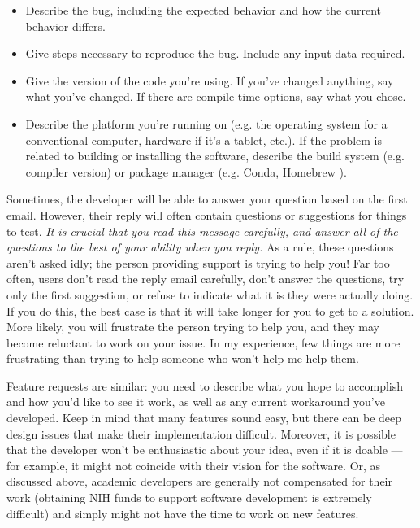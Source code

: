\documentclass[9pt,training]{livecoms}
\begin{document}
\begin{itemize}

    \item Describe the bug, including the expected behavior and how the current
    behavior differs.

    \item Give steps necessary to reproduce the bug. Include any input data
    required.

    \item Give the version of the code you're using. If you've changed anything,
    say what you've changed. If there are compile-time options, say what you
    chose.

    \item Describe the platform you're running on (e.g. the operating system for
    a conventional computer, hardware if it's a tablet, etc.). If the problem is
    related to building or installing the software, describe the build system
    (e.g. compiler version) or package manager (e.g. Conda\cite{CONDA}, Homebrew \cite{HOMEBREW}).

\end{itemize}

Sometimes, the developer will be able to answer your question based on the first
email. However, their reply will often contain questions or suggestions for
things to test. \emph{It is crucial that you read this message carefully, and
answer all of the questions to the best of your ability when you reply.} As a
rule, these questions aren't asked idly; the person providing support is trying
to help you! Far too often, users don't read the reply email carefully, don't
answer the questions, try only the first suggestion, or refuse to indicate what
it is they were actually doing. If you do this, the best case is that it will
take longer for you to get to a solution. More likely, you will frustrate the
person trying to help you, and they may become reluctant to work on your issue.
In my experience, few things are more frustrating than trying to help someone
who won't help me help them.

Feature requests are similar: you need to describe what you hope to accomplish
and how you'd like to see it work, as well as any current workaround you've
developed. Keep in mind that many features sound easy, but there can be deep
design issues that make their implementation difficult. Moreover, it is possible
that the developer won't be enthusiastic about your idea, even if it is doable
--- for example, it might not coincide with their vision for the software. Or,
as discussed above, academic developers are generally not compensated for their
work (obtaining NIH funds to support software development is extremely
difficult) and simply might not have the time to work on new features.
\end{document}
